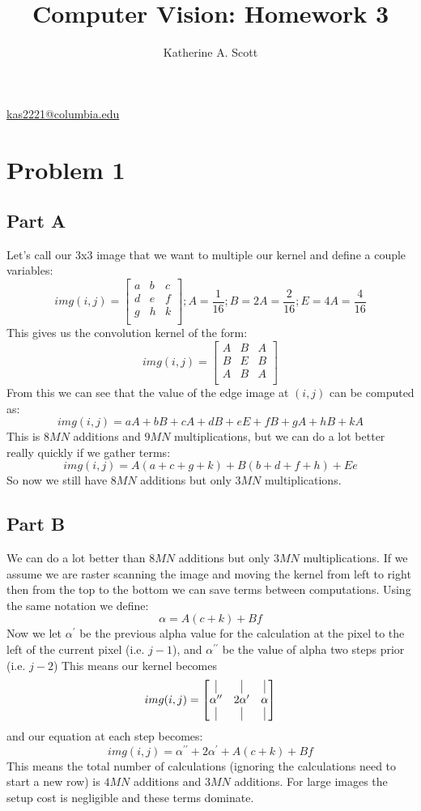 \documentclass{article}
\begin{document}
\title{Computer Vision: Homework 3}

\author{Katherine A. Scott}
\maketitle
\mbox{}
\begin{center}
\href{mailto:katherineAScott@gmail.com}{kas2221@columbia.edu}

\end{center}
\section{Problem 1}
\subsection{Part A}
Let's call our 3x3 image that we want to multiple our kernel and define a couple variables:
\[img(i,j)=
 \begin{bmatrix}
  a & b & c \\
  d & e & f \\
  g & h & k \\
 \end{bmatrix}; A = \frac{1}{16}; B=2A=\frac{2}{16}; E=4A=\frac{4}{16}
\]
This gives us the convolution kernel of the form:
\[img(i,j)=
 \begin{bmatrix}
  A & B & A \\
  B & E & B \\
  A & B & A \\
 \end{bmatrix}
\]
From this we can see that the value of the edge image at $(i,j)$ can be computed as:
\[
img(i,j)=aA+bB+cA+dB+eE+fB+gA+hB+kA
\]
This is $8MN$ additions and $9MN$ multiplications, but we can do a lot better really quickly if we gather terms:
\[
img(i,j)=A(a+c+g+k)+B(b+d+f+h)+Ee
\]
So now we still have $8MN$ additions but only $3MN$ multiplications.
\subsection{Part B} 
We can do a lot better than $8MN$ additions but only $3MN$ multiplications. If we assume we are raster scanning the image and moving the kernel from left to right then from the top to the bottom we can save terms between computations. Using the same notation we define:
\[
\alpha = A(c+k)+Bf 
\]
Now we let $\alpha^{\prime}$ be the previous alpha value for the calculation at the pixel to the left of the current pixel (i.e. $j-1$), and $\alpha^{\prime \prime}$ be the value of alpha two steps prior (i.e. $j-2$) This means our kernel becomes
\[
img(i,j)=
\begin{bmatrix}
\vline & \vline & \vline\\
\alpha^{\prime\prime} & 2\alpha^{\prime} &\alpha \\
\vline & \vline & \vline\\
\end{bmatrix}
\]
and our equation at each step becomes:
\[
img(i,j)=\alpha^{\prime\prime} +2\alpha^{\prime} + A(c+k)+Bf 
\]
This means the total number of calculations (ignoring the calculations need to start a new row) is $4MN$ additions and $3MN$ additions. For large images the setup cost is negligible and these terms dominate. 
\end{document}
